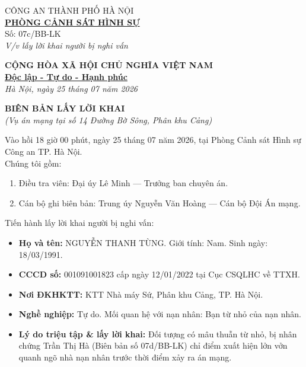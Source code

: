 \documentclass[12pt,a4paper]{article}
\begin{document}
\noindent
\begin{minipage}[t]{0.45\textwidth}
    \begin{center}
        \small
        CÔNG AN THÀNH PHỐ HÀ NỘI\\
        \textbf{\underline{PHÒNG CẢNH SÁT HÌNH SỰ}}\\[0.1cm]
        Số: 07c/BB-LK\\
        \textit{V/v lấy lời khai người bị nghi vấn}
    \end{center}
\end{minipage}
\hfill
\begin{minipage}[t]{0.52\textwidth}
    \begin{center}
        \small
        \textbf{CỘNG HÒA XÃ HỘI CHỦ NGHĨA VIỆT NAM}\\
        \textbf{\underline{Độc lập - Tự do - Hạnh phúc}}\\[0.1cm]
        \textit{Hà Nội, ngày 25 tháng 07 năm 2026}
    \end{center}
\end{minipage}

\vspace{0.6cm}

\begin{center}
    \textbf{\large BIÊN BẢN LẤY LỜI KHAI}\\
    \textit{(Vụ án mạng tại số 14 Đường Bờ Sông, Phân khu Cảng)}
\end{center}

\vspace{0.3cm}

\noindent Vào hồi 18 giờ 00 phút, ngày 25 tháng 07 năm 2026, tại Phòng Cảnh sát Hình sự Công an TP. Hà Nội.\\
Chúng tôi gồm:
\begin{enumerate}[label=\arabic*., leftmargin=1.5cm]
    \item Điều tra viên: Đại úy Lê Minh — Trưởng ban chuyên án.
    \item Cán bộ ghi biên bản: Trung úy Nguyễn Văn Hoàng — Cán bộ Đội Án mạng.
\end{enumerate}

\noindent Tiến hành lấy lời khai người bị nghi vấn:
\begin{itemize}[leftmargin=1.5cm]
    \item \textbf{Họ và tên:} NGUYỄN THANH TÙNG. Giới tính: Nam. Sinh ngày: 18/03/1991.
    \item \textbf{CCCD số:} 001091001823 cấp ngày 12/01/2022 tại Cục CSQLHC về TTXH.
    \item \textbf{Nơi ĐKHKTT:} KTT Nhà máy Sứ, Phân khu Cảng, TP. Hà Nội.
    \item \textbf{Nghề nghiệp:} Tự do. Mối quan hệ với nạn nhân: Bạn từ nhỏ của nạn nhân.
    \item \textbf{Lý do triệu tập \& lấy lời khai:} Đối tượng có mâu thuẫn từ nhỏ, bị nhân chứng Trần Thị Hà (Biên bản số 07d/BB-LK) chỉ điểm xuất hiện lởn vởn quanh ngõ nhà nạn nhân trước thời điểm xảy ra án mạng.
\end{itemize}
\end{document}
